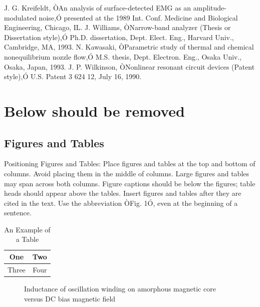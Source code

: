 \documentclass[letterpaper, 10 pt, conference]{ieeeconf}  %
\begin{document}
\begin{thebibliography}{99}
 J. G. Kreifeldt, ÒAn analysis of surface-detected EMG as an amplitude-modulated noise,Ó presented at the 1989 Int. Conf. Medicine and Biological Engineering, Chicago, IL.
 J. Williams, ÒNarrow-band analyzer (Thesis or Dissertation style),Ó Ph.D. dissertation, Dept. Elect. Eng., Harvard Univ., Cambridge, MA, 1993. 
 N. Kawasaki, ÒParametric study of thermal and chemical nonequilibrium nozzle flow,Ó M.S. thesis, Dept. Electron. Eng., Osaka Univ., Osaka, Japan, 1993.
 J. P. Wilkinson, ÒNonlinear resonant circuit devices (Patent style),Ó U.S. Patent 3 624 12, July 16, 1990. 

\end{thebibliography}

\section{Below should be removed}

\subsection{Figures and Tables}

Positioning Figures and Tables: Place figures and tables at the top and bottom of columns. Avoid placing them in the middle of columns. Large figures and tables may span across both columns. Figure captions should be below the figures; table heads should appear above the tables. Insert figures and tables after they are cited in the text. Use the abbreviation ÒFig. 1Ó, even at the beginning of a sentence.

\begin{table}[h]
\caption{An Example of a Table}
\label{table_example}
\begin{center}
\begin{tabular}{|c||c|}
\hline
One & Two\\
\hline
Three & Four\\
\hline
\end{tabular}
\end{center}
\end{table}


   \begin{figure}[thpb]
      \centering
      \caption{Inductance of oscillation winding on amorphous
       magnetic core versus DC bias magnetic field}
      \label{figurelabel}
   \end{figure}
   
\end{document}

